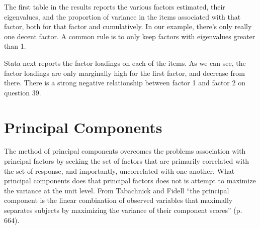 \documentclass[12pt]{article}
\begin{document}
The first table in the results reports the various factors estimated,
their eigenvalues, and the proportion of variance in the items
associated with that factor, both for that factor and cumulatively. 
In our example, there's only really one decent factor. A common rule
is to only keep factors with eigenvalues greater than 1.

Stata next reports the factor loadings on each of the items. As we can
see, the factor loadings are only marginally high for the first
factor, and decrease from there. There is a strong negative
relationship between factor 1 and factor 2 on question 39. 

\section{Principal Components}

The method of principal components overcomes the problems association
with principal factors by seeking the set of factors that are
primarily correlated with the set of response, and importantly,
uncorrelated with one another. What principal components does that
principal factors does not is attempt to maximize the variance at the
unit level. From Tabachnick and Fidell ``the principal component is
the linear combination of observed variables that maximally separates
subjects by maximizing the variance of their component scores''
(p. 664). 
\end{document}
